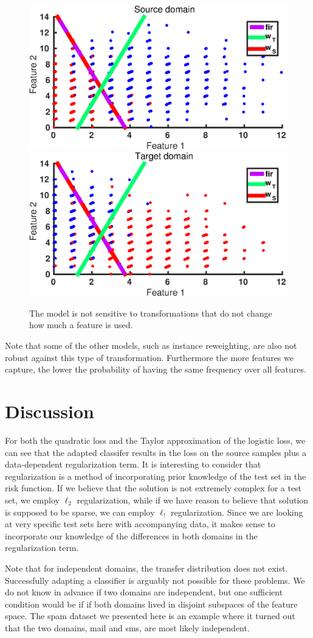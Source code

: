 \documentclass[twoside,11pt]{article}
\begin{document}
\begin{figure}[ht]
	\centering
	\includegraphics[width=.48\textwidth]{images/da_artexp_sens_model_2.eps}
	\includegraphics[width=.48\textwidth]{images/da_artexp_sens_model_3.eps}
	\caption{The model is not sensitive to transformations that do not change how much a feature is used.}
	\label{sens_model}
\end{figure}

Note that some of the other models, such as instance reweighting, are also not robust against this type of transformation. Furthermore the more features we capture, the lower the probability of having the same frequency over all features.

\section{Discussion}
For both the quadratic loss and the Taylor approximation of the logistic loss, we can see that the adapted classifer results in the loss on the source samples plus a data-dependent regularization term. It is interesting to consider that regularization is a method of incorporating prior knowledge of the test set in the risk function. If we believe that the solution is not extremely complex for a test set, we employ $\ell_{2}$ regularization, while if we have reason to believe that solution is supposed to be sparse, we can employ $\ell_{!}$ regularization. Since we are looking at very specific test sets here with accompanying data, it makes sense to incorporate our knowledge of the differences in both domains in the regularization term.

Note that for independent domains, the transfer distribution does not exist. Successfully adapting a classifier is arguably not possible for these problems. We do not know in advance if two domains are independent, but one sufficient condition would be if if both domains lived in disjoint subspaces of the feature space. The spam dataset we presented here is an example where it turned out that the two domains, mail and sms, are most likely independent.
\end{document}
